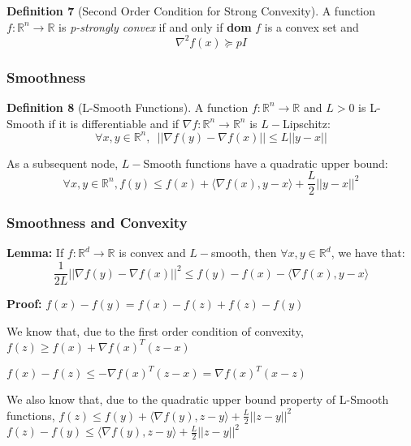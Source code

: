 \noindent \textbf{Definition 7} (Second Order Condition for Strong Convexity). A function $f: \mathbb{R}^n \rightarrow \mathbb{R}$ is \textit{p-strongly convex} if and only if \textbf{dom} $f$ is a convex set and 
\begin{equation}
    \nabla^2 f(x) \succeq pI
\end{equation}

\subsubsection{Smoothness}
\noindent \textbf{Definition 8} (L-Smooth Functions). A function $f: \mathbb{R}^n \rightarrow \mathbb{R}$ and $L > 0$ is L-Smooth if it is differentiable and if $\nabla f: \mathbb{R}^n \rightarrow \mathbb{R}^n$ is $L-$Lipschitz: 
\begin{equation}
    \forall x, y \in \mathbb{R}^n, \enspace ||\nabla f(y) - \nabla f(x)|| \leq L ||y - x||
\end{equation}

\noindent As a subsequent node, $L-$Smooth functions have a quadratic upper bound: 
\begin{equation}
    \forall x, y \in \mathbb{R}^n, f(y) \leq f(x) + \langle \nabla f(x), y - x \rangle + \frac{L}{2} ||y - x||^2
\end{equation}

\subsubsection{Smoothness and Convexity}
\noindent \textbf{Lemma:} If $f: \mathbb{R}^d \rightarrow \mathbb{R}$ is convex and $L-$smooth, then $\forall x, y \in \mathbb{R}^d$, we have that: 
\begin{equation}
    \frac{1}{2L} ||\nabla f(y) - \nabla f(x)||^2 \leq f(y) - f(x) - \langle \nabla f(x), y - x \rangle
\end{equation}

\noindent \textbf{Proof:} 
$f(x) - f(y) = f(x) - f(z) + f(z) - f(y)$ \newline 

\noindent We know that, due to the first order condition of convexity, $f(z) \geq f(x) + \nabla f(x)^T (z - x)$

\noindent $f(x) - f(z) \leq -\nabla f(x)^T (z - x) = \nabla f(x)^T(x - z)$ 

\noindent We also know that, due to the quadratic upper bound property of L-Smooth functions, \newline 
$f(z) \leq f(y) + \langle \nabla f(y), z - y \rangle + \frac{L}{2} ||z - y||^2$ \newline 
$f(z) - f(y) \leq \langle \nabla f(y), z - y \rangle + \frac{L}{2} ||z - y||^2$ \newline 

